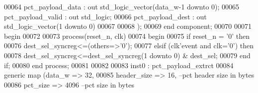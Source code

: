 \begin{DoxyCode}
00064         pct_payload_data    : \textcolor{keywordflow}{out} \textcolor{comment}{std\_logic\_vector}(data_w\textcolor{vhdlchar}{-}\textcolor{vhdllogic}{}\textcolor{vhdllogic}{1} \textcolor{keywordflow}{downto} \textcolor{vhdllogic}{}\textcolor{vhdllogic}{0});
00065         pct_payload_valid   : \textcolor{keywordflow}{out} \textcolor{comment}{std\_logic};
00066         pct_payload_dest    : \textcolor{keywordflow}{out} \textcolor{comment}{std\_logic\_vector}(\textcolor{vhdllogic}{}\textcolor{vhdllogic}{1} \textcolor{keywordflow}{downto} \textcolor{vhdllogic}{}\textcolor{vhdllogic}{0})
00067         
00068         );
00069 \textcolor{keywordflow}{end} \textcolor{keywordflow}{component};
00070   
00071 \textcolor{vhdlkeyword}{begin}
00072 
00073 \textcolor{keywordflow}{process}(reset_n, clk)
00074 \textcolor{vhdlkeyword}{begin}
00075     \textcolor{keywordflow}{if} \textcolor{vhdlchar}{reset_n} \textcolor{vhdlchar}{=} \textcolor{vhdlchar}{'}\textcolor{vhdllogic}{}\textcolor{vhdllogic}{0}\textcolor{vhdlchar}{'} \textcolor{keywordflow}{then} 
00076         \textcolor{vhdlchar}{dest_sel_syncreg}\textcolor{vhdlchar}{<=}\textcolor{vhdlchar}{(}\textcolor{keywordflow}{others}\textcolor{vhdlchar}{=}\textcolor{vhdlchar}{>}\textcolor{vhdlchar}{'}\textcolor{vhdllogic}{}\textcolor{vhdllogic}{0}\textcolor{vhdlchar}{'}\textcolor{vhdlchar}{)};
00077     \textcolor{keywordflow}{elsif}   \textcolor{vhdlchar}{(}\textcolor{vhdlchar}{clk}\textcolor{vhdlchar}{'}\textcolor{vhdlkeyword}{event} \textcolor{keywordflow}{and} \textcolor{vhdlchar}{clk}\textcolor{vhdlchar}{=}\textcolor{vhdlchar}{'}\textcolor{vhdllogic}{}\textcolor{vhdllogic}{0}\textcolor{vhdlchar}{'}\textcolor{vhdlchar}{)} \textcolor{keywordflow}{then} 
00078         \textcolor{vhdlchar}{dest_sel_syncreg}\textcolor{vhdlchar}{<=}\textcolor{vhdlchar}{dest_sel_syncreg}\textcolor{vhdlchar}{(}\textcolor{vhdllogic}{}\textcolor{vhdllogic}{1} \textcolor{keywordflow}{downto} \textcolor{vhdllogic}{}\textcolor{vhdllogic}{0}\textcolor{vhdlchar}{)} \textcolor{vhdlchar}{&} \textcolor{vhdlchar}{dest_sel};
00079     \textcolor{keywordflow}{end} \textcolor{keywordflow}{if};
00080 \textcolor{keywordflow}{end} \textcolor{keywordflow}{process};
00081 
00082 
00083 inst0 :  pct_payload_extrct
00084     \textcolor{keywordflow}{generic} \textcolor{keywordflow}{map} (data_w         => \textcolor{vhdllogic}{32},
00085                     header_size     => \textcolor{vhdllogic}{16},\textcolor{keyword}{ --pct header size in bytes }
00086                     pct_size            => \textcolor{vhdllogic}{4096} \textcolor{keyword}{--pct size in bytes}

\end{DoxyCode}
